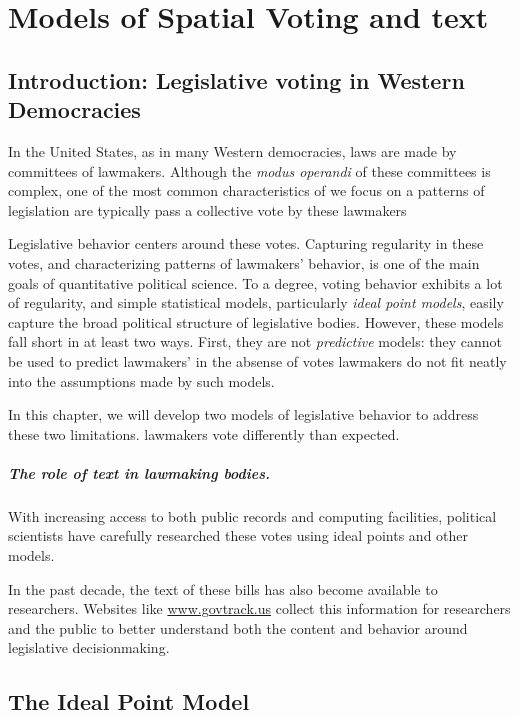 \chapter{Models of Spatial Voting and text}

\section*{Introduction: Legislative voting in Western Democracies}

In the United States, as in many Western democracies, laws are made by
committees of lawmakers.  Although the \emph{modus operandi} of these
committees is complex, one of the most common characteristics of we
focus on a patterns of legislation are typically pass a collective
vote by these lawmakers

Legislative behavior centers around these votes.  Capturing regularity
in these votes, and characterizing patterns of lawmakers' behavior, is
one of the main goals of quantitative political science.  To a degree,
voting behavior exhibits a lot of regularity, and simple statistical
models, particularly \textit{ideal point models}, easily capture the
broad political structure of legislative bodies.  However, these
models fall short in at least two ways.  First, they are not
\emph{predictive} models: they cannot be used to predict lawmakers' in
the absense of votes lawmakers do not fit neatly into the assumptions
made by such models.

In this chapter, we will develop two models of legislative behavior to
address these two limitations.  lawmakers vote
differently than expected.

\paragraph{The role of text in lawmaking bodies.}
With increasing access to both public records and computing
facilities, political scientists have carefully researched these votes
using ideal points and other models.

In the past decade, the text of these bills has also become available
to researchers.  Websites like \url{www.govtrack.us}
\cite{govtrack:2009} collect this information for researchers and the
public to better understand both the content and behavior around
legislative decisionmaking.

\section{The Ideal Point Model}
\label{sec:model}

